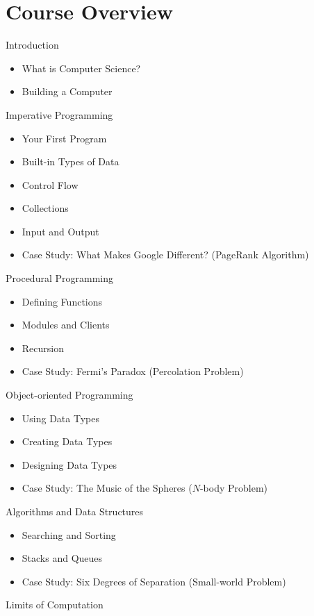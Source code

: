 \documentclass[8pt,a4paper,compress]{beamer}
\begin{document}
\section{Course Overview}

\begin{frame}[fragile]
\pause

Introduction
\begin{itemize}
\item What is Computer Science?
\item Building a Computer
\end{itemize}

\pause
\bigskip

Imperative Programming
\begin{itemize}
\item Your First Program
\item Built-in Types of Data
\item Control Flow
\item Collections
\item Input and Output
\item Case Study: What Makes Google Different? (PageRank Algorithm)
\end{itemize}
\end{frame}

\begin{frame}[fragile]
\pause

Procedural Programming
\begin{itemize}
\item Defining Functions
\item Modules and Clients
\item Recursion
\item Case Study: Fermi's Paradox (Percolation Problem)
\end{itemize}

\pause
\bigskip

Object-oriented Programming
\begin{itemize}
\item Using Data Types
\item Creating Data Types
\item Designing Data Types
\item Case Study: The Music of the Spheres ($N$-body Problem)
\end{itemize}

\pause
\bigskip

Algorithms and Data Structures
\begin{itemize}
\item Searching and Sorting
\item Stacks and Queues
\item Case Study: Six Degrees of Separation (Small-world Problem)
\end{itemize}

\pause
\bigskip

Limits of Computation
\end{frame}
\end{document}

